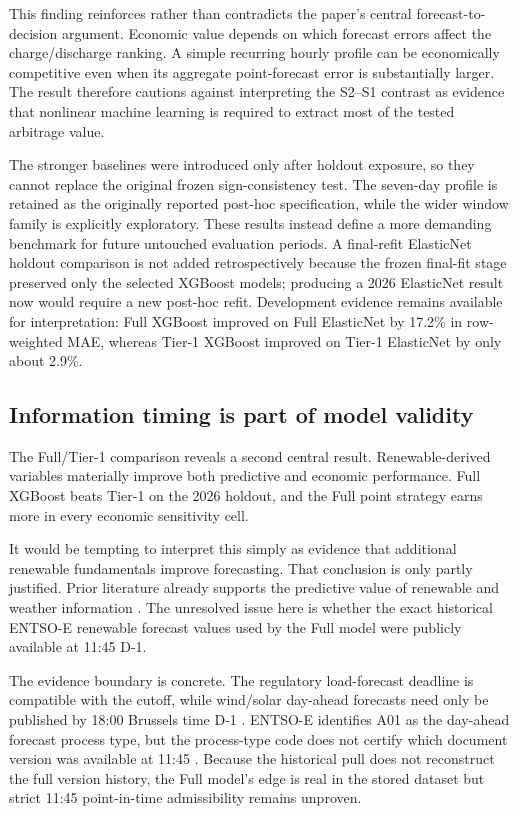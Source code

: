 This finding reinforces rather than contradicts the paper's central forecast-to-decision argument. Economic value depends on which forecast errors affect the charge/discharge ranking. A simple recurring hourly profile can be economically competitive even when its aggregate point-forecast error is substantially larger. The result therefore cautions against interpreting the S2--S1 contrast as evidence that nonlinear machine learning is required to extract most of the tested arbitrage value.

The stronger baselines were introduced only after holdout exposure, so they cannot replace the original frozen sign-consistency test. The seven-day profile is retained as the originally reported post-hoc specification, while the wider window family is explicitly exploratory. These results instead define a more demanding benchmark for future untouched evaluation periods. A final-refit ElasticNet holdout comparison is not added retrospectively because the frozen final-fit stage preserved only the selected XGBoost models; producing a 2026 ElasticNet result now would require a new post-hoc refit. Development evidence remains available for interpretation: Full XGBoost improved on Full ElasticNet by 17.2\% in row-weighted MAE, whereas Tier-1 XGBoost improved on Tier-1 ElasticNet by only about 2.9\%.
\subsection{Information timing is part of model validity}

The Full/Tier-1 comparison reveals a second central result. Renewable-derived variables materially improve both predictive and economic performance. Full XGBoost beats Tier-1 on the 2026 holdout, and the Full point strategy earns more in every economic sensitivity cell.

It would be tempting to interpret this simply as evidence that additional renewable fundamentals improve forecasting. That conclusion is only partly justified. Prior literature already supports the predictive value of renewable and weather information \citep{ziel2015,kathziel2018,sgarlato2023}. The unresolved issue here is whether the exact historical ENTSO-E renewable forecast values used by the Full model were publicly available at 11:45 D-1.

The evidence boundary is concrete. The regulatory load-forecast deadline is compatible with the cutoff, while wind/solar day-ahead forecasts need only be published by 18:00 Brussels time D-1 \citep{eureg543}. ENTSO-E identifies A01 as the day-ahead forecast process type, but the process-type code does not certify which document version was available at 11:45 \citep{entsoefaq2024}. Because the historical pull does not reconstruct the full version history, the Full model's edge is real in the stored dataset but strict 11:45 point-in-time admissibility remains unproven.

